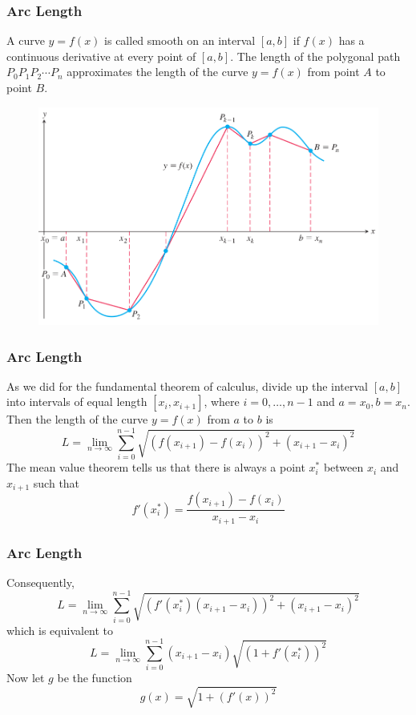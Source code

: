 \documentclass[xcolor=dvipsnames]{beamer}
\begin{document}
\begin{frame}
  \frametitle{Arc Length}
  A curve $y=f(x)$ is called \alert{smooth} on an interval $[a,b]$ if
  $f(x)$ has a continuous derivative at every point of $[a,b]$. The
  length of the polygonal path $P_{0}P_{1}P_{2}\cdots{}P_{n}$
  approximates the length of the curve $y=f(x)$ from point $A$ to
  point $B$.
  \begin{figure}[h]
    \includegraphics[scale=0.25]{./diagrams/pollen.png}
  \end{figure}
  \end{frame}

\begin{frame}
  \frametitle{Arc Length}
  As we did for the fundamental theorem of calculus, divide up the
  interval $[a,b]$ into intervals of equal length $[x_{i},x_{i+1}]$,
  where $i=0,\ldots,n-1$ and $a=x_{0},b=x_{n}$. Then the length of the
  curve $y=f(x)$ from $a$ to $b$ is
  \begin{equation}
    \label{eq:eeyohpha}
    L=\lim_{n\rightarrow\infty}\sum_{i=0}^{n-1}\sqrt{\left(f(x_{i+1})-f(x_{i})\right)^{2}+\left(x_{i+1}-x_{i}\right)^{2}}
  \end{equation}
The mean value theorem tells us that there is always a point
$x_{i}^{\ast}$ between $x_{i}$ and $x_{i+1}$ such that
\begin{equation}
  \label{eq:oshachie}
  f'(x_{i}^{\ast})=\frac{f(x_{i+1})-f(x_{i})}{x_{i+1}-x_{i}}
\end{equation}
\end{frame}

\begin{frame}
  \frametitle{Arc Length}
Consequently,
  \begin{equation}
    \label{eq:ahchoode}
    L=\lim_{n\rightarrow\infty}\sum_{i=0}^{n-1}\sqrt{\left(f'(x_{i}^{\ast})\left(x_{i+1}-x_{i}\right)\right)^{2}+\left(x_{i+1}-x_{i}\right)^{2}}
  \end{equation}
which is equivalent to
\begin{equation}
  \label{eq:jooquaiw}
    L=\lim_{n\rightarrow\infty}\sum_{i=0}^{n-1}\left(x_{i+1}-x_{i}\right)\sqrt{\left(1+f'(x_{i}^{\ast})\right)^{2}}
\end{equation}
Now let $g$ be the function
\begin{equation}
  \label{eq:eicahdei}
  g(x)=\sqrt{1+\left(f'(x)\right)^{2}}
\end{equation}
\end{frame}
\end{document}
